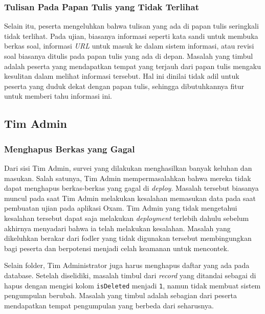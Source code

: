     \subsubsection{Tulisan Pada Papan Tulis yang Tidak
    Terlihat}\label{ref-prob-peserta-papan-tulis} Selain itu, peserta
    mengeluhkan bahwa tulisan yang ada di papan tulis seringkali tidak terlihat.
    Pada ujian, biasanya informasi seperti kata sandi untuk membuka berkas soal,
    informasi \textit{URL} untuk masuk ke dalam sistem informasi, atau revisi
    soal biasanya ditulis pada papan tulis yang ada di depan. Masalah yang
    timbul adalah peserta yang mendapatkan tempat yang terjauh dari papan tulis
    mengaku kesulitan dalam melihat informasi tersebut. Hal ini dinilai tidak
    adil untuk peserta yang duduk dekat dengan papan tulis, sehingga
    dibutuhkannya fitur untuk memberi tahu informasi ini.

\subsection{Tim Admin}
    \subsubsection{Menghapus Berkas yang
    Gagal}\label{ref-prob-admin-berkas-gagal} Dari sisi Tim Admin, survei yang
    dilakukan menghasilkan banyak keluhan dan masukan. Salah satunya, Tim Admin
    mempermasalahkan bahwa mereka tidak dapat menghapus berkas-berkas yang gagal
    di \textit{deploy}. Masalah tersebut biasanya muncul pada saat Tim Admin
    melakukan kesalahan memasukan data pada saat pembuatan ujian pada aplikasi
    Oxam. Tim Admin yang tidak mengetahui kesalahan tersebut dapat saja
    melakukan \textit{deployment} terlebih dahulu sebelum akhirnya menyadari
    bahwa ia telah melakukan kesalahan. Masalah yang dikeluhkan berakar dari
    fodler yang tidak digunakan tersebut membingungkan bagi peserta dan
    berpotensi menjadi celah keamanan untuk mencontek.

    Selain folder, Tim Administrator juga harus menghapus daftar yang ada pada
    database. Setelah diselidiki, masalah timbul dari \textit{record} yang
    ditandai sebagai di hapus dengan mengisi kolom \texttt{isDeleted} menjadi
    \texttt{1}, namun tidak membuat sistem pengumpulan berubah. Masalah yang
    timbul adalah sebagian dari peserta mendapatkan tempat pengumpulan yang
    berbeda dari seharusnya.

